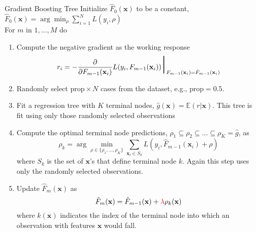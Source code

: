 \documentclass{beamer}
\begin{document}
\begin{frame}{Gradient Boosting Tree}
\footnotesize
Initialize $\hat F_0(\mathbf{x})$ to be a constant, $\hat F_0(\mathbf{x}) = \arg \min_{\rho} \sum_{i=1}^N L(y_i,\rho)$ \\
For $m$ in $1,\ldots,M$ do
\begin{enumerate}\footnotesize
\item Compute the negative gradient as the working response
    \begin{equation}
    r_i = -\frac{\partial}{\partial F_{m-1}(\mathbf{x}_i)} L(y_i,F_{m-1}(\mathbf{x}_i)) \mbox{\Huge $|$}_{F_{m-1}(\mathbf{x}_i)=\hat F_{m-1}(\mathbf{x}_i)}
    \end{equation}
\item Randomly select $\mathrm{prop}\times N$ cases from the dataset, e.g., $\mathrm{prop} = 0.5$.
\item Fit a regression tree with $K$ terminal nodes, $\hat g(\mathbf{x})=\mathbb{E}(r|\mathbf{x})$. This tree is fit using only those randomly selected observations
\item Compute the optimal terminal node predictions, $\rho_1\subseteq \rho_2 \subseteq \dots \subseteq \rho_K=\hat g$, as
    \begin{equation}
    \rho_k = \arg \min_{\rho\in \{\rho_1,\ldots,\rho_K\}} \sum_{\mathbf{x}_i\in S_k} L(y_i,\hat F_{m-1}(\mathbf{x}_i)+\rho)
    \end{equation}
where $S_k$ is the set of $\mathbf{x}$'s that define terminal node $k$. Again this step uses only the randomly selected observations.
\item Update $\hat F_{m}(\mathbf{x})$ as
    \begin{equation}
    \hat F_m(\mathbf{x}) = \hat F_{m-1}(\mathbf{x}) + {\color{red}{\lambda}} \rho_{k}(\mathbf{x})
    \end{equation}
where $k(\mathbf{x})$ indicates the index of the terminal node into which an observation with features $\mathbf{x}$ would fall.
\end{enumerate}
\end{frame}
\end{document}
